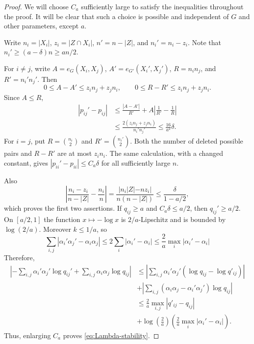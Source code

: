 \documentclass{article}
\newcommand{\s}[1]{\left(#1\right)}
\begin{document}
\begin{proof}
We will choose $C_a$ sufficiently large to satisfy the inequalities throughout the proof. It will be clear that such a choice is possible and independent of $G$ and other parameters, except $a$. 

Write $n_i=|X_i|$, $z_i=|Z\cap X_i|$, $n'=n-|Z|$, and $n_i'=n_i-z_i$. Note that $n_i'\ge(a-\delta)n\ge an/2$.

For $i\ne j$, write $A=e_G(X_i,X_j)$, $A'=e_{G'}(X_i',X_j')$, $R=n_i n_j$, and $R'=n_i'n_j'$.  Then
\[
 0\le A-A'\le z_i n_j+z_j n_i,
 \qquad
 0\le R-R'\le z_i n_j+z_j n_i.
\]
Since $A\le R$,
\begin{align*}
 |p_{ij}'-p_{ij}|
 &\le \frac{|A-A'|}{R'}+A\left|\frac1{R'}-\frac1R\right|\\
 &\le \frac{2(z_i n_j+z_j n_i)}{n_i'n_j'}
 \le \frac{16}{a^2}\delta.
\end{align*}
For $i=j$, put $R=\binom{n_i}{2}$ and $R'=\binom{n_i'}{2}$.  Both the number of deleted possible pairs and $R-R'$ are at most $z_i n_i$.  The same calculation, with a changed constant, gives $|p_{ii}'-p_{ii}|\le C_a\delta$ for all sufficiently large $n$.

Also
\[
 \left|\frac{n_i-z_i}{n-|Z|}-\frac{n_i}{n}\right|
 =\frac{|n_i|Z|-nz_i|}{n(n-|Z|)}\le \frac{\delta}{1-a/2},
\]
which proves the first two assertions. If $q_{ij}\ge a$ and $C_a\delta\le a/2$, then $q_{ij}'\ge a/2$.  On $[a/2,1]$ the function $x\mapsto-\log x$ is $2/a$-Lipschitz and is bounded by $\log(2/a)$.  Moreover $k\le1/a$, so
\[
 \sum_{i,j}|\alpha_i'\alpha_j'-\alpha_i\alpha_j|
 \le 2\sum_i|\alpha_i'-\alpha_i|
 \le \frac2a \max_i|\alpha_i'-\alpha_i|
\]
Therefore,
\begin{align*}
\left|
 -\sum_{i,j}\alpha_i'\alpha_j'\log q_{ij}'
 +\sum_{i,j}\alpha_i\alpha_j\log q_{ij}
 \right|
 &\leq\left|\sum_{i,j} \alpha_i'\alpha_j'(\log q_{ij}-\log q'_{ij})\right| \\
 &+\left|\sum_{i,j} (\alpha_i\alpha_j - \alpha_i'\alpha_j') \log q_{ij}\right| \\
 &\leq \frac2a\max_{i,j}\left|q'_{ij}-q_{ij}\right|\\
 &+ \log\s{\frac2a}\s{\frac2a\max_i\left|\alpha_i'-\alpha_i\right|}.
\end{align*}
Thus, enlarging $C_a$ proves \eqref{eq:Lambda-stability}.
\end{proof}
\end{document}
